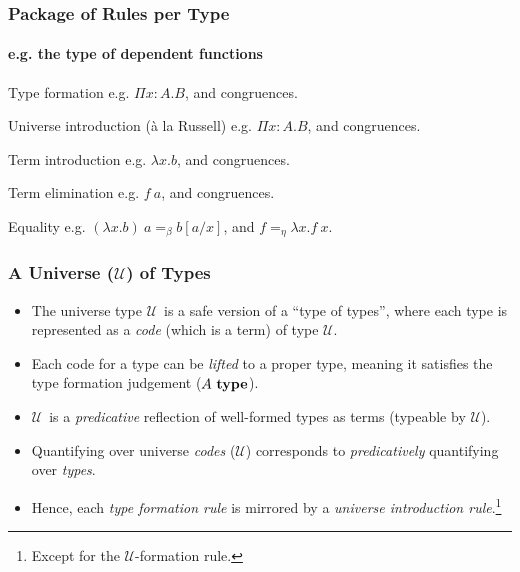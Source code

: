 \documentclass[mathserif,usenames,dvipsnames]{beamer}
\newcommand{\istype}[1]{\ensuremath{#1 ~\textbf{\textrm{type}}}}
\newcommand{\Funv}[3]{\ensuremath{\Pi #1{:}#2. #3}}
\newcommand{\Fun}[2]{\Funv{x}{#1}{#2}}
\newcommand{\funv}[2]{\ensuremath{\lambda #1. #2}}
\newcommand{\fun}[1]{\funv{x}{#1}}
\newcommand{\app}[2]{\ensuremath{#1~#2}}
\newcommand{\sub}[2]{\ensuremath{#1[#2/x]}}
\newcommand{\Type}[0]{\ensuremath{\mathcal{U}}}
\begin{document}
\begin{frame}
\frametitle{Package of Rules per Type}
\framesubtitle{e.g. the type of dependent functions}

\begin{block}{Type formation}
e.g. \Fun{A}{B}, and congruences.
\end{block}

\begin{block}{Universe introduction ({\`a} la Russell)}
e.g. \Fun{A}{B}, and congruences.
\end{block}

\begin{block}{Term introduction}
e.g. \fun{b}, and congruences.
\end{block}

\begin{block}{Term elimination}
e.g. \app{f}{a}, and congruences.
\end{block}

\begin{block}{Equality}
  e.g. $\app{(\fun{b})}{a} =_\beta \sub{b}{a}$, and
  $f =_\eta \fun{\app{f}{x}}$.
\end{block}

\end{frame}

\begin{frame}
\frametitle{A Universe (\Type) of Types}

\begin{itemize}

\item
The universe type \Type ~is a safe version of a ``type of types'',
where each type is represented as a \textit{code}
(which is a term) of type \Type.

\item
Each code for a type can be \textit{lifted} to a proper type,
meaning it satisfies the type formation judgement (\istype{A}).

\item
\Type ~is a \textit{predicative} reflection of well-formed types
as terms (typeable by \Type).

\item
Quantifying over universe \textit{codes} (\Type) corresponds to
\textit{predicatively} quantifying over \textit{types}. 

\item
Hence, each \textit{type formation rule} is mirrored
by a \textit{universe introduction rule}.\footnote{
  Except for the \Type-formation rule.
  }

\end{itemize}

\end{frame}
\end{document}
